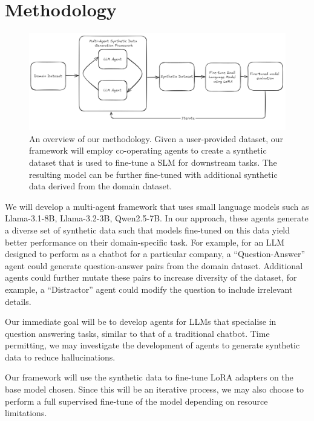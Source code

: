 \section{Methodology}

\begin{figure}[h]
  \centering
  \includegraphics[width=1\textwidth]{methodology.jpg}
  \caption{An overview of our methodology. Given a user-provided dataset, our
framework will employ co-operating agents to create a synthetic dataset that is
used to fine-tune a SLM for downstream tasks. The resulting model can be further
fine-tuned with additional synthetic data derived from the domain dataset.}
\end{figure}

We will develop a multi-agent framework that uses small language models such as
Llama-3.1-8B, Llama-3.2-3B, Qwen2.5-7B. In our approach, these agents generate a
diverse set of synthetic data such that models fine-tuned on this data yield
better performance on their domain-specific task. For example, for an LLM
designed to perform as a chatbot for a particular company, a ``Question-Answer''
agent could generate question-answer pairs from the domain dataset. Additional
agents could further mutate these pairs to increase diversity of the dataset,
for example, a ``Distractor'' agent could modify the question to include
irrelevant details.

Our immediate goal will be to develop agents for LLMs that specialise in
question answering tasks, similar to that of a traditional chatbot. Time
permitting, we may investigate the development of agents to generate synthetic
data to reduce hallucinations.

Our framework will use the synthetic data to fine-tune LoRA adapters on the base
model chosen. Since this will be an iterative process, we may also choose to
perform a full supervised fine-tune of the model depending on resource
limitations.

